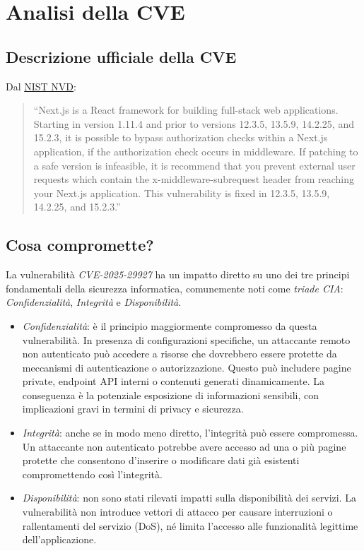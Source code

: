 \documentclass[a4paper,oneside,12pt]{report}
\begin{document}
\chapter{Analisi della CVE}
\label{chap:analisi-cve}

\section{Descrizione ufficiale della CVE}
\label{sec:descrizione-ufficiale-cve}

Dal \href{https://cve.mitre.org/cgi-bin/cvename.cgi?name=CVE-2025-29927}{NIST NVD}:
\begin{quote}
``Next.js is a React framework for building full-stack web applications. Starting in version 1.11.4 and prior to versions 12.3.5, 13.5.9, 14.2.25, and 15.2.3, it is possible to bypass authorization checks within a Next.js application, if the authorization check occurs in middleware. If patching to a safe version is infeasible, it is recommend that you prevent external user requests which contain the x-middleware-subrequest header from reaching your Next.js application. This vulnerability is fixed in 12.3.5, 13.5.9, 14.2.25, and 15.2.3.''
\end{quote}

\section{Cosa compromette?}
\label{sec:cosa-compromette}

La vulnerabilità \emph{CVE-2025-29927} ha un impatto diretto su uno dei tre principi fondamentali della sicurezza informatica, comunemente noti come \emph{triade CIA}: \emph{Confidenzialità}, \emph{Integrità} e \emph{Disponibilità}.

\begin{itemize}
  \item \emph{Confidenzialità}: è il principio maggiormente compromesso da questa vulnerabilità. In presenza di configurazioni specifiche, un attaccante remoto non autenticato può accedere a risorse che dovrebbero essere protette da meccanismi di autenticazione o autorizzazione. Questo può includere pagine private, endpoint API interni o contenuti generati dinamicamente. La conseguenza è la potenziale esposizione di informazioni sensibili, con implicazioni gravi in termini di privacy e sicurezza.
  \item \emph{Integrità}: anche se in modo meno diretto, l’integrità può essere compromessa. Un attaccante non autenticato potrebbe avere accesso ad una o pi\`u pagine protette che consentono d'inserire o modificare dati gi\`a esistenti compromettendo cos\`i l'integrit\`a.
  \item \emph{Disponibilità}: non sono stati rilevati impatti sulla disponibilità dei servizi. La vulnerabilità non introduce vettori di attacco per causare interruzioni o rallentamenti del servizio (DoS), né limita l’accesso alle funzionalità legittime dell’applicazione.
\end{itemize}
\end{document}
